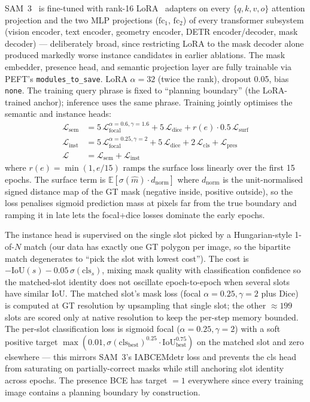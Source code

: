 \documentclass[11pt]{article}
\begin{document}
SAM~3~\cite{meta2025sam3} is fine-tuned with rank-16 LoRA~\cite{hu2022lora} adapters on every $\{q, k, v, o\}$ attention projection and the two MLP projections ($\text{fc}_1$, $\text{fc}_2$) of every transformer subsystem (vision encoder, text encoder, geometry encoder, DETR encoder/decoder, mask decoder) --- deliberately broad, since restricting LoRA to the mask decoder alone produced markedly worse instance candidates in earlier ablations. The mask embedder, presence head, and semantic projection layer are fully trainable via PEFT's \texttt{modules\_to\_save}. LoRA $\alpha = 32$ (twice the rank), dropout 0.05, bias \texttt{none}. The training query phrase is fixed to ``planning boundary'' (the LoRA-trained anchor); inference uses the same phrase. Training jointly optimises the semantic and instance heads:
\begin{align}
  \mathcal{L}_{\text{sem}} &= 5\,\mathcal{L}_{\text{focal}}^{\alpha=0.6,\gamma=1.6} + 5\,\mathcal{L}_{\text{dice}} + r(e) \cdot 0.5\,\mathcal{L}_{\text{surf}} \nonumber \\
  \mathcal{L}_{\text{inst}} &= 5\,\mathcal{L}_{\text{focal}}^{\alpha=0.25,\gamma=2} + 5\,\mathcal{L}_{\text{dice}} + 2\,\mathcal{L}_{\text{cls}} + \mathcal{L}_{\text{pres}} \nonumber \\
  \mathcal{L} &= \mathcal{L}_{\text{sem}} + \mathcal{L}_{\text{inst}}
  \label{eq:sam3-loss}
\end{align}
where $r(e) = \min(1, e/15)$ ramps the surface loss linearly over the first 15 epochs. The surface term is $\mathbb{E}\!\left[ \sigma(\hat{m}) \cdot d_{\text{norm}} \right]$ where $d_{\text{norm}}$ is the unit-normalised signed distance map of the GT mask (negative inside, positive outside), so the loss penalises sigmoid prediction mass at pixels far from the true boundary and ramping it in late lets the focal+dice losses dominate the early epochs.

The instance head is supervised on the single slot picked by a Hungarian-style 1-of-$N$ match (our data has exactly one GT polygon per image, so the bipartite match degenerates to ``pick the slot with lowest cost''). The cost is $-\text{IoU}(s) - 0.05\,\sigma(\text{cls}_s)$, mixing mask quality with classification confidence so the matched-slot identity does not oscillate epoch-to-epoch when several slots have similar IoU. The matched slot's mask loss (focal $\alpha{=}0.25, \gamma{=}2$ plus Dice) is computed at GT resolution by upsampling that single slot; the other $\approx 199$ slots are scored only at native resolution to keep the per-step memory bounded. The per-slot classification loss is sigmoid focal ($\alpha{=}0.25, \gamma{=}2$) with a soft positive target $\max(0.01, \sigma(\text{cls}_{\text{best}})^{0.25} \cdot \text{IoU}_{\text{best}}^{0.75})$ on the matched slot and zero elsewhere --- this mirrors SAM~3's IABCEMdetr loss and prevents the cls head from saturating on partially-correct masks while still anchoring slot identity across epochs. The presence BCE has target $= 1$ everywhere since every training image contains a planning boundary by construction.
\end{document}
